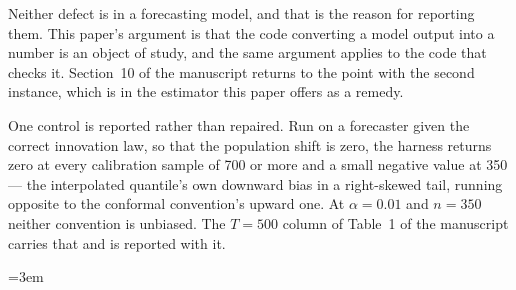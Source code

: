 \documentclass[preprint,11pt,authoryear]{elsarticle}
\newcommand{\1}{\boldsymbol{1}}
\begin{document}
Neither defect is in a forecasting model, and that is the reason for reporting
them. This paper's argument is that the code converting a model output into a
number is an object of study, and the same argument applies to the code that
checks it. Section~10 of the manuscript returns to the point with the second
instance, which is in the estimator this paper offers as a remedy.

One control is reported rather than repaired. Run on a forecaster given the
correct innovation law, so that the population shift is zero, the harness returns
zero at every calibration sample of 700 or more and a small negative value at 350
--- the interpolated quantile's own downward bias in a right-skewed tail, running
opposite to the conformal convention's upward one. At $\alpha = 0.01$ and
$n = 350$ neither convention is unbiased. The $T = 500$ column of
Table~1 of the manuscript carries that and is reported with it.

\sloppy\emergencystretch=3em


\end{document}
